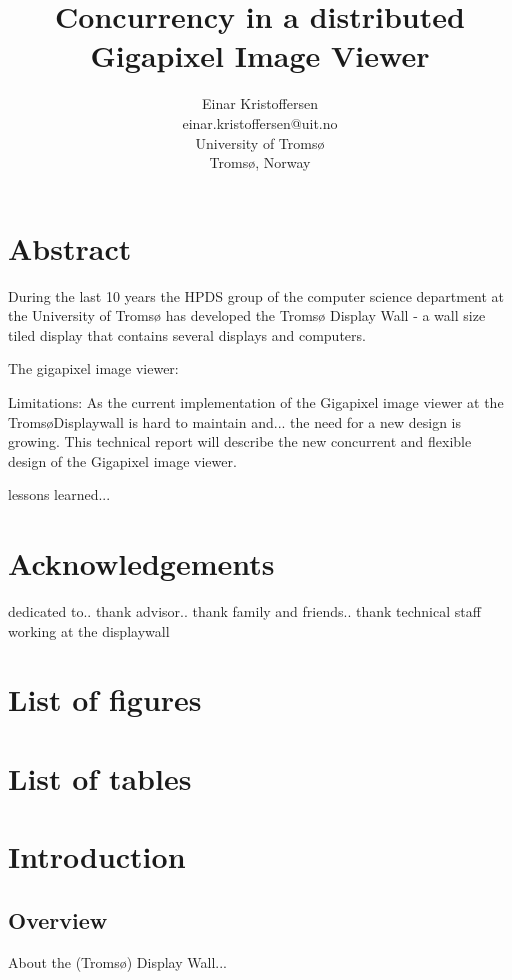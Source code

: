 \documentclass[12pt, a4paper, oneside]{article}
\begin{document}
\title{\bfseries {Concurrency in a distributed \\Gigapixel Image Viewer}}
\author{Einar Kristoffersen \\
einar.kristoffersen@uit.no\\
University of Troms\o\\
Troms\o, Norway}
\date{}

\maketitle

%
\newpage
\tableofcontents
\newpage




\section{Abstract}
During the last 10 years the HPDS group of the computer science department at the University of Tromsø has developed the Tromsø Display Wall - a wall size tiled display that contains several displays and computers.

The gigapixel image viewer:


Limitations:
As the current implementation of the Gigapixel image viewer at the Troms\o Displaywall is hard to maintain and... the need for a new design is growing. This technical report will describe the new concurrent and flexible design of the Gigapixel image viewer.

lessons learned...

\section{Acknowledgements}
dedicated to..
thank advisor..
thank family and friends..
thank technical staff working at the displaywall
\newpage
\section{List of figures}
\section{List of tables}
\newpage

\section{Introduction}
\subsection{Overview}
About the (Tromsø) Display Wall...
\end{document}
